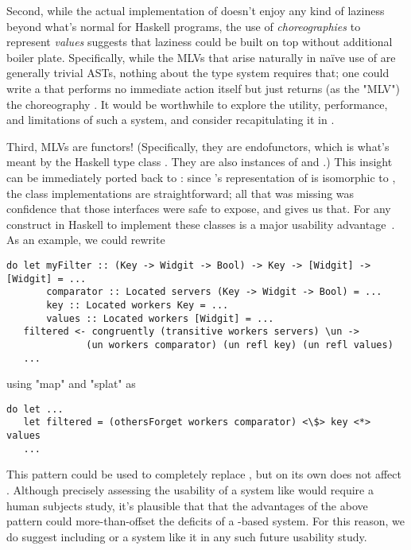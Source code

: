 Second, while the actual implementation of \minichor doesn't enjoy any kind of laziness beyond what's normal for Haskell programs,
the use of \emph{choreographies} to represent \emph{values} suggests that laziness could be built on top without additional boiler plate.
Specifically, while the MLVs that arise naturally in naïve use of \minichor are generally trivial  ASTs,
nothing about the type system requires that;
one could write a  that performs no immediate action itself but just returns
(as the "MLV") the choreography .
It would be worthwhile to explore the utility, performance, and limitations of such a system,
and consider recapitulating it in \MultiChor.

Third, MLVs are functors!
(Specifically, they are endofunctors, which is what's meant by the Haskell type class .
They are also instances of  and .)
This insight can be immediately ported back to \MultiChor:
since \MultiChor's representation of  is isomorphic to ,
the class implementations are straightforward;
all that was missing was confidence that those interfaces were safe to expose, and \minichor gives us that.
For any construct in Haskell to implement these classes is a major usability advantage~\cite[Chapter~4]{haskell-cookbook}.
As an example, we could rewrite
\begin{verbatim}
do let myFilter :: (Key -> Widgit -> Bool) -> Key -> [Widgit] -> [Widgit] = ...
       comparator :: Located servers (Key -> Widgit -> Bool) = ...
       key :: Located workers Key = ...
       values :: Located workers [Widgit] = ...
   filtered <- congruently (transitive workers servers) \un ->
              (un workers comparator) (un refl key) (un refl values)
   ...
\end{verbatim}
using "map" and "splat" as 
\begin{verbatim}
do let ...
   let filtered = (othersForget workers comparator) <\$> key <*> values
   ...
\end{verbatim}
This pattern could be used to completely replace ,
but on its own does not affect .
Although precisely assessing the usability of a system like \MultiChor would require a human subjects study,
it's plausible that that the advantages of the above pattern could more-than-offset the deficits of a -based system.
For this reason, we do suggest including \minichor or a system like it in any such future usability study.


